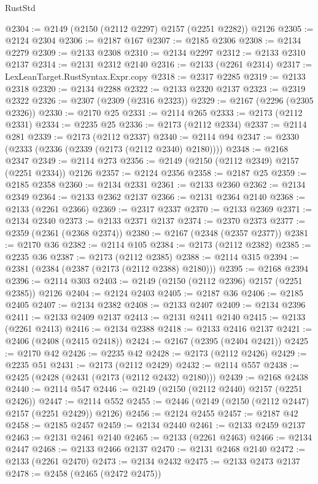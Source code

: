 \begin{lexlean}{RustStd}
\begin{coremodule}
@2304 := @2149 (@2150 (@2112 @2297) @2157 (@2251 @2282)) @2126
@2305 := @2124 @2304
@2306 := @2187 @167
@2307 := @2185 @2306
@2308 := @2134 @2279
@2309 := @2133 @2308
@2310 := @2134 @2297
@2312 := @2133 @2310 @2137
@2314 := @2131 @2312 @2140
@2316 := @2133 (@2261 @2314)
@2317 := LexLeanTarget.RustSyntax.Expr.copy
@2318 := @2317 @2285
@2319 := @2133 @2318
@2320 := @2134 @2288
@2322 := @2133 @2320 @2137
@2323 := @2319 @2322
@2326 := @2307 (@2309 (@2316 @2323))
@2329 := @2167 (@2296 (@2305 @2326))
@2330 := @2170 @25
@2331 := @2114 @265
@2333 := @2173 (@2112 @2331)
@2334 := @2235 @25
@2336 := @2173 (@2112 @2334)
@2337 := @2114 @281
@2339 := @2173 (@2112 @2337)
@2340 := @2114 @94
@2347 := @2330 (@2333 (@2336 (@2339 (@2173 (@2112 @2340) @2180))))
@2348 := @2168 @2347
@2349 := @2114 @273
@2356 := @2149 (@2150 (@2112 @2349) @2157 (@2251 @2334)) @2126
@2357 := @2124 @2356
@2358 := @2187 @25
@2359 := @2185 @2358
@2360 := @2134 @2331
@2361 := @2133 @2360
@2362 := @2134 @2349
@2364 := @2133 @2362 @2137
@2366 := @2131 @2364 @2140
@2368 := @2133 (@2261 @2366)
@2369 := @2317 @2337
@2370 := @2133 @2369
@2371 := @2134 @2340
@2373 := @2133 @2371 @2137
@2374 := @2370 @2373
@2377 := @2359 (@2361 (@2368 @2374))
@2380 := @2167 (@2348 (@2357 @2377))
@2381 := @2170 @36
@2382 := @2114 @105
@2384 := @2173 (@2112 @2382)
@2385 := @2235 @36
@2387 := @2173 (@2112 @2385)
@2388 := @2114 @315
@2394 := @2381 (@2384 (@2387 (@2173 (@2112 @2388) @2180)))
@2395 := @2168 @2394
@2396 := @2114 @303
@2403 := @2149 (@2150 (@2112 @2396) @2157 (@2251 @2385)) @2126
@2404 := @2124 @2403
@2405 := @2187 @36
@2406 := @2185 @2405
@2407 := @2134 @2382
@2408 := @2133 @2407
@2409 := @2134 @2396
@2411 := @2133 @2409 @2137
@2413 := @2131 @2411 @2140
@2415 := @2133 (@2261 @2413)
@2416 := @2134 @2388
@2418 := @2133 @2416 @2137
@2421 := @2406 (@2408 (@2415 @2418))
@2424 := @2167 (@2395 (@2404 @2421))
@2425 := @2170 @42
@2426 := @2235 @42
@2428 := @2173 (@2112 @2426)
@2429 := @2235 @51
@2431 := @2173 (@2112 @2429)
@2432 := @2114 @557
@2438 := @2425 (@2428 (@2431 (@2173 (@2112 @2432) @2180)))
@2439 := @2168 @2438
@2440 := @2114 @547
@2446 := @2149 (@2150 (@2112 @2440) @2157 (@2251 @2426))
@2447 := @2114 @552
@2455 := @2446 (@2149 (@2150 (@2112 @2447) @2157 (@2251 @2429)) @2126)
@2456 := @2124 @2455
@2457 := @2187 @42
@2458 := @2185 @2457
@2459 := @2134 @2440
@2461 := @2133 @2459 @2137
@2463 := @2131 @2461 @2140
@2465 := @2133 (@2261 @2463)
@2466 := @2134 @2447
@2468 := @2133 @2466 @2137
@2470 := @2131 @2468 @2140
@2472 := @2133 (@2261 @2470)
@2473 := @2134 @2432
@2475 := @2133 @2473 @2137
@2478 := @2458 (@2465 (@2472 @2475))

\end{coremodule}
\end{lexlean}

